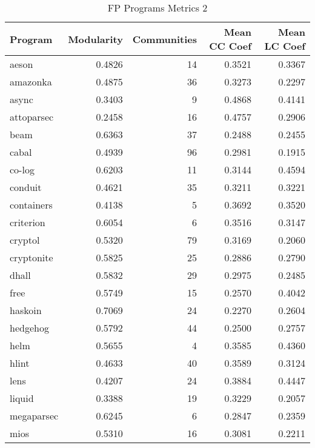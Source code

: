 \documentclass[12pt, a4paper]{article}
\begin{document}
\begin{longtable}[H]{l r r r r}
    \caption{FP Programs Metrics 2}\label{table:fp_metrics_2}\\
        Program & Modularity & Communities & Mean CC Coef & Mean LC Coef \\
        \hline            
        \endhead
        aeson      &  0.4826  &  14  &  0.3521 &  0.3367 \\      
        amazonka   &  0.4875  &  36  &  0.3273 &  0.2297 \\      
        async      &  0.3403  &   9  &  0.4868 &  0.4141 \\      
        attoparsec &  0.2458  &  16  &  0.4757 &  0.2906 \\      
        beam       &  0.6363  &  37  &  0.2488 &  0.2455 \\      
        cabal      &  0.4939  &  96  &  0.2981 &  0.1915 \\      
        co-log     &  0.6203  &  11  &  0.3144 &  0.4594 \\      
        conduit    &  0.4621  &  35  &  0.3211 &  0.3221 \\      
        containers &  0.4138  &   5  &  0.3692 &  0.3520 \\      
        criterion  &  0.6054  &   6  &  0.3516 &  0.3147 \\      
        cryptol    &  0.5320  &  79  &  0.3169 &  0.2060 \\      
        cryptonite &  0.5825  &  25  &  0.2886 &  0.2790 \\      
        dhall      &  0.5832  &  29  &  0.2975 &  0.2485 \\      
        free       &  0.5749  &  15  &  0.2570 &  0.4042 \\      
        haskoin    &  0.7069  &  24  &  0.2270 &  0.2604 \\      
        hedgehog   &  0.5792  &  44  &  0.2500 &  0.2757 \\      
        helm       &  0.5655  &   4  &  0.3585 &  0.4360 \\      
        hlint      &  0.4633  &  40  &  0.3589 &  0.3124 \\      
        lens       &  0.4207  &  24  &  0.3884 &  0.4447 \\      
        liquid     &  0.3388  &  19  &  0.3229 &  0.2057 \\      
        megaparsec &  0.6245  &   6  &  0.2847 &  0.2359 \\      
        mios       &  0.5310  &  16  &  0.3081 &  0.2211 \\      

\end{longtable}
\end{document}
